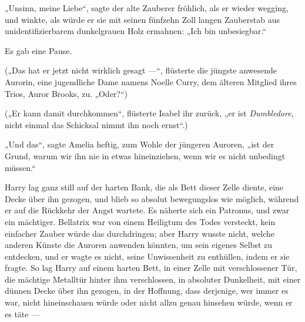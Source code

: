 „Unsinn, meine Liebe“, sagte der alte Zauberer fröhlich, als er wieder wegging, und winkte, als würde er sie mit seinen fünfzehn Zoll langen Zauberstab aus unidentifizierbarem dunkelgrauen Holz ermahnen:
„Ich bin unbesiegbar.“

Es gab eine Pause.

(„Das hat er jetzt nicht wirklich gesagt —“, flüsterte die jüngste anwesende Aurorin, eine jugendliche Dame namens Noelle Curry, dem älteren Mitglied ihres Trios, Auror Brooks, zu.
„Oder?“)

(„Er kann damit durchkommen“, flüsterte Isabel ihr zurück, „er ist \emph{Dumbledore}, nicht einmal das Schicksal nimmt ihn noch ernst“.)

„Und das“, sagte Amelia heftig, zum Wohle der jüngeren Auroren, „ist der Grund, warum wir ihn nie in etwas hineinziehen, wenn wir es nicht unbedingt müssen.“

\later

Harry lag ganz still auf der harten Bank, die als Bett dieser Zelle diente, eine Decke über ihn gezogen, und blieb so absolut bewegungslos wie möglich, während er auf die Rückkehr der Angst wartete. Es näherte sich ein Patronus, und zwar ein mächtiger. Bellatrix war von einem Heiligtum des Todes versteckt, kein einfacher Zauber würde das durchdringen; aber Harry wusste nicht, welche anderen Künste die Auroren anwenden könnten, um sein eigenes Selbst zu entdecken, und er wagte es nicht, seine Unwissenheit zu enthüllen, indem er sie fragte. So lag Harry auf einem harten Bett, in einer Zelle mit verschlossener Tür, die mächtige Metalltür hinter ihm verschlossen, in absoluter Dunkelheit, mit einer dünnen Decke über ihn gezogen, in der Hoffnung, dass derjenige, wer immer es war, nicht hineinschauen würde oder nicht allzu genau hinsehen würde, wenn er es täte —

